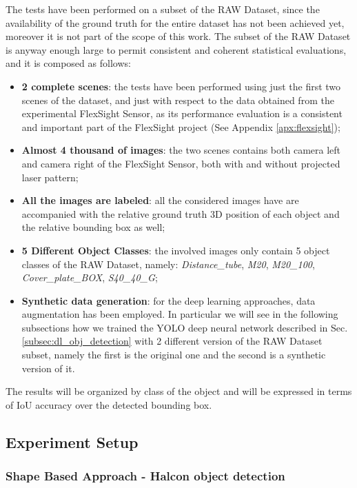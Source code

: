 The tests have been performed on a subset of the RAW Dataset, since the availability of the ground truth for the entire dataset has not been achieved yet, moreover it is not part of the scope of this work. The subset of the RAW Dataset is anyway enough large to permit consistent and coherent statistical evaluations, and it is composed as follows:

\begin{itemize}
	\item \textbf{2 complete scenes}: the tests have been performed using just the first two scenes of the dataset, and just with respect to the data obtained from the experimental FlexSight Sensor, as its performance evaluation is a consistent and important part of the FlexSight project (See Appendix \ref{apx:flexsight});
	\item \textbf{Almost 4 thousand of images}: the two scenes contains both camera left and camera right of the FlexSight Sensor, both with and without projected laser pattern;
	\item \textbf{All the images are labeled}: all the considered images have are accompanied with the relative ground truth 3D position of each object and the relative bounding box as well;
	\item \textbf{5 Different Object Classes}: the involved images only contain 5 object classes of the RAW Dataset, namely: \emph{Distance\_tube}, \emph{M20}, \emph{M20\_100}, \emph{Cover\_plate\_BOX}, \emph{S40\_40\_G};
	\item \textbf{Synthetic data generation}: for the deep learning approaches, data augmentation has been employed. In particular we will see in the following subsections how we trained the YOLO deep neural network described in Sec. \ref{subsec:dl_obj_detection} with 2 different version of the RAW Dataset subset, namely the first is the original one and the second is a synthetic version of it.
\end{itemize}

The results will be organized by class of the object and will be expressed in terms of IoU accuracy over the detected bounding box.

\subsection{Experiment Setup}

\subsubsection{Shape Based Approach - Halcon object detection}\label{subsec:halcon_obj_det_results}

